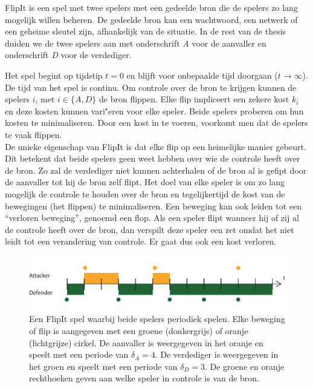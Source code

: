 \documentclass[master=cws, masteroption=vs,english]{kulemt}
\begin{document}
\begin{abstract*}
FlipIt is een spel met twee spelers met een gedeelde bron die de spelers zo lang mogelijk willen beheren. De gedeelde bron kan een wachtwoord, een netwerk of een geheime sleutel zijn, afhankelijk van de situatie. In de rest van de thesis duiden we de twee spelers aan met onderschrift  \textit{A} voor de aanvaller en onderschrift \textit{D} voor de verdediger.

Het spel begint op tijdstip $ t = 0 $ en blijft voor onbepaalde tijd doorgaan ($ t \rightarrow \infty $). De tijd van het spel is continu. Om controle over de bron te krijgen kunnen de spelers $i$, met $ i \in \{A, D \} $ de bron flippen. Elke flip impliceert een zekere kost $ k_{i} $ en deze kosten kunnen vari"eren voor elke speler. Beide spelers proberen om hun kosten te minimaliseren. Door een kost in te voeren, voorkomt men dat de spelers te vaak flippen. \\

De unieke eigenschap van FlipIt is dat elke flip op een heimelijke manier gebeurt. Dit betekent dat beide spelers geen weet hebben over wie de controle heeft over de bron. Zo zal de verdediger niet kunnen achterhalen of de bron al is gefipt door de aanvaller tot hij de bron zelf flipt. Het doel van elke speler is om zo lang mogelijk de controle te houden over de bron en tegelijkertijd de kost van de bewegingen (het flippen) te minimaliseren. Een beweging kan ook leiden tot een ``verloren beweging'', genoemd een flop.  Als een speler flipt wanneer hij of zij al de controle  heeft over de bron, dan verspilt deze speler een zet omdat het niet leidt tot een verandering van controle. Er gaat dus ook een kost verloren. \\


\begin{figure}[hbtp]
\center
\includegraphics[scale=0.6]{../../doc/template/Images/FlipBasic}
\caption{Een FlipIt spel waarbij beide spelers periodiek spelen. Elke beweging of flip is aangegeven met een groene (donkergrijs) of oranje (lichtgrijze) cirkel. De aanvaller is weergegeven in het oranje en speelt met een periode van $ \delta_{A} = 4 $. De verdediger is weergegeven in het groen en speelt met een periode van $ \delta_{D} = 3 $. De groene en oranje rechthoeken geven aan welke speler in controle is van de bron.}
\label{fig: FLipItDefault}
\end{figure}




\end{abstract*}
\end{document}
